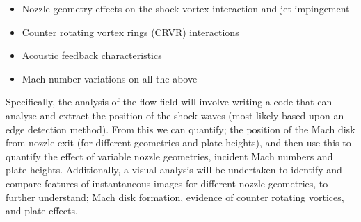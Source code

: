 \begin{itemize}
	\item Nozzle geometry effects on the shock-vortex interaction and jet impingement
	\item Counter rotating vortex rings (CRVR) interactions
	\item Acoustic feedback characteristics
	\item Mach number variations on all the above
\end{itemize}
Specifically, the analysis of the flow field will involve writing a code that can analyse and extract the position of the shock waves (most likely based upon an edge detection method). From this we can quantify; the position of the Mach disk from nozzle exit (for different geometries and plate heights), and then use this to quantify the effect of variable nozzle geometries, incident Mach numbers and plate heights. Additionally, a visual analysis will be undertaken to identify and compare features of instantaneous images for different nozzle geometries, to further understand; Mach disk formation, evidence of counter rotating vortices, and plate effects.
\newpage
\footnotesize
